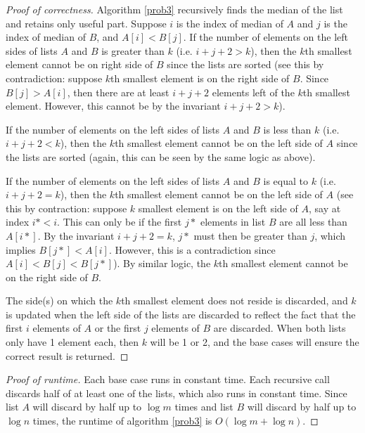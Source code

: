 \documentclass{article}
\begin{document}
	\begin{proof}[Proof of correctness]
	Algorithm \ref{prob3} recursively finds the median of the list and retains only useful part. Suppose $i$ is the index of median of $A$ and $j$ is the index of median of $B$, and $A[i]<B[j]$. If the number of elements on the left sides of lists $A$ and $B$ is greater than $k$ (i.e. $i+j+2>k$), then the $k$th smallest element cannot be on right side of $B$ since the lists are sorted (see this by contradiction: suppose $k$th smallest element is on the right side of $B$. Since $B[j]>A[i]$, then there are at least $i+j+2$ elements left of the $k$th smallest element. However, this cannot be by the invariant $i+j+2>k$).
	
	If the number of elements on the left sides of lists $A$ and $B$ is less than $k$ (i.e. $i+j+2<k$), then the $k$th smallest element cannot be on the left side of $A$ since the lists are sorted (again, this can be seen by the same logic as above).
	
	If the number of elements on the left sides of lists $A$ and $B$ is equal to $k$ (i.e. $i+j+2=k$), then the $k$th smallest element cannot be on the left side of $A$ (see this by contraction: suppose $k$ smallest element is on the left side of $A$, say at index $i*<i$. This can only be if the first $j*$ elements in list $B$ are all less than $A[i*]$. By the invariant $i+j+2=k$, $j*$ must then be greater than $j$, which implies $B[j*]<A[i]$. However, this is a contradiction since $A[i]<B[j]<B[j*]$). By similar logic, the $k$th smallest element cannot be on the right side of $B$.
	
	The side(s) on which the $k$th smallest element does not reside is discarded, and $k$ is updated when the left side of the lists are discarded to reflect the fact that the first $i$ elements of $A$ or the first $j$ elements of $B$ are discarded. When both lists only have 1 element each, then $k$ will be 1 or 2, and the base cases will ensure the correct result is returned.
	\end{proof}
	\begin{proof}[Proof of runtime]
	Each base case runs in constant time. Each recursive call discards half of at least one of the lists, which also runs in constant time. Since list $A$ will discard by half up to $\log m$ times and list $B$ will discard by half up to $\log n$ times, the runtime of algorithm \ref{prob3} is $O(\log m + \log n)$.
	\end{proof}
	
\pagebreak
	
\end{document}
